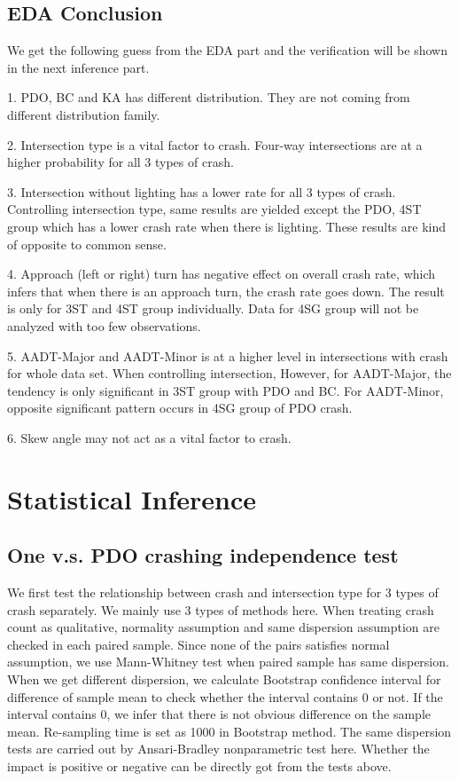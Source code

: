 \documentclass[11pt]{scrartcl} %
\begin{document}
\subsection{EDA Conclusion}

We get the following guess from the EDA part and the verification will be shown in the next inference part.

1. PDO, BC and KA has different distribution. They are not coming from different distribution family.

2. Intersection type is a vital factor to crash. Four-way intersections are at a higher probability for all 3 types of crash.

3. Intersection without lighting has a lower rate for all 3 types of crash. Controlling intersection type, same results are yielded except the PDO, 4ST group which has a lower crash rate when there is lighting. These results are kind of opposite to common sense.

4. Approach (left or right) turn has negative effect on overall crash rate, which infers that when there is an approach turn, the crash rate goes down. The result is only for 3ST and 4ST group individually. Data for 4SG group will not be analyzed with too few observations.

5. AADT-Major and AADT-Minor is at a higher level in intersections with crash for whole data set. When controlling intersection, However, for AADT-Major, the tendency is only significant in 3ST group with PDO and BC. For AADT-Minor, opposite significant pattern occurs in 4SG group of PDO crash.

6. Skew angle may not act as a vital factor to crash.

\section{Statistical Inference}

\subsection{One v.s. PDO crashing independence test}

We first test the relationship between crash and intersection type for 3 types of crash separately. We mainly use 3 types of methods here. When treating crash count as qualitative, normality assumption and same dispersion assumption are checked in each paired sample. Since none of the pairs satisfies normal assumption, we use Mann-Whitney test when paired sample has same dispersion. When we get different dispersion, we calculate Bootstrap confidence interval for difference of sample mean to check whether the interval contains 0 or not. If the interval contains 0, we infer that there is not obvious difference on the sample mean. Re-sampling time is set as 1000 in Bootstrap method. The same dispersion tests are carried out by Ansari-Bradley nonparametric test here. Whether the impact is positive or negative can be directly got from the tests above.
\end{document}
